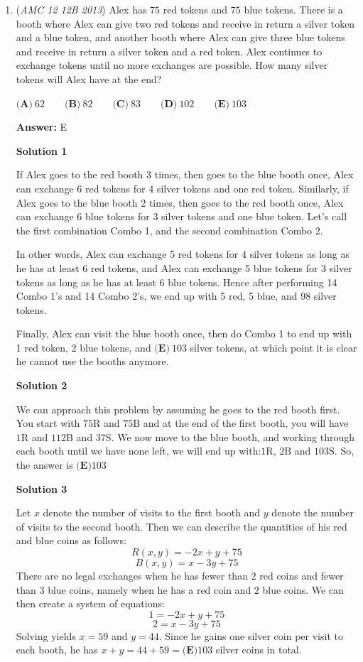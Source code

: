 \begin{enumerate}
	\item (\textit{AMC 12 12B 2013}) Alex has $75$ red tokens and $75$ blue tokens. There is a booth where Alex can give two red tokens and receive in return a silver token and a blue token, and another booth where Alex can give three blue tokens and receive in return a silver token and a red token. Alex continues to exchange tokens until no more exchanges are possible. How many silver tokens will Alex have at the end?


 $\textbf{(A)}\ 62 \qquad \textbf{(B)}\ 82 \qquad \textbf{(C)}\ 83 \qquad \textbf{(D)}\ 102 \qquad \textbf{(E)}\ 103$

 \textbf{Answer: }E



\textbf{Solution 1}

If Alex goes to the red booth 3 times, then goes to the blue booth once, Alex can exchange 6 red tokens for 4 silver tokens and one red token. Similarly, if Alex goes to the blue booth 2 times, then goes to the red booth once, Alex can exchange 6 blue tokens for 3 silver tokens and one blue token. Let's call the first combination Combo 1, and the second combination Combo 2.

 In other words, Alex can exchange 5 red tokens for 4 silver tokens as long as he has at least 6 red tokens, and Alex can exchange 5 blue tokens for 3 silver tokens as long as he has at least 6 blue tokens. Hence after performing 14 Combo 1's and 14 Combo 2's, we end up with 5 red, 5 blue, and 98 silver tokens.

 Finally, Alex can visit the blue booth once, then do Combo 1 to end up with 1 red token, 2 blue tokens, and $\boxed{\textbf{(E)}\ 103}$ silver tokens, at which point it is clear he cannot use the booths anymore.

 



\textbf{Solution 2}

We can approach this problem by assuming he goes to the red booth first. You start with $75 \text{R}$ and $75 \text{B}$ and at the end of the first booth, you will have $1 \text{R}$ and $112 \text{B}$ and $37 \text{S}$. We now move to the blue booth, and working through each booth until we have none left, we will end up with:$1 \text{R}$, $2 \text{B}$ and $103 \text{S}$. So, the answer is $\boxed{\textbf{(E)}103}$




\textbf{Solution 3}

Let $x$ denote the number of visits to the first booth and $y$ denote the number of visits to the second booth. Then we can describe the quantities of his red and blue coins as follows:
 \[R(x,y)=-2x+y+75\]
 \[B(x,y)=x-3y+75\]There are no legal exchanges when he has fewer than $2$ red coins and fewer than $3$ blue coins, namely when he has a red coin and $2$ blue coins. We can then create a system of equations:
 \[1=-2x+y+75\]
 \[2=x-3y+75\]Solving yields $x=59$ and $y=44$. Since he gains one silver coin per visit to each booth, he has $x+y=44+59=\boxed{\textbf{(E)}103}$ silver coins in total.


\end{enumerate}
